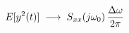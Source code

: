 \documentclass[preview]{standalone}
\begin{document}
\begin{align*}
\special{dvisvgm:raw <g id='unique000'>}E[y^2(t)] \;\longrightarrow\; S_{xx}(j\omega_0)\,\frac{\Delta\omega}{2\pi}\special{dvisvgm:raw </g>}
\end{align*}
\end{document}
